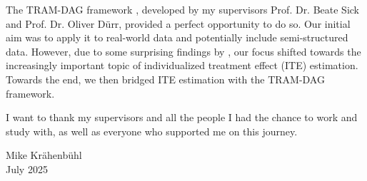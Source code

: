 \documentclass[11pt,a4paper,twoside]{book}
\begin{document}
The TRAM-DAG framework \citep{sick2025}, developed by my supervisors Prof. Dr. Beate Sick and Prof. Dr. Oliver D{\"u}rr, provided a perfect opportunity to do so. Our initial aim was to apply it to real-world data and potentially include semi-structured data. However, due to some surprising findings by \citet{chen2025}, our focus shifted towards the increasingly important topic of individualized treatment effect (ITE) estimation. Towards the end, we then bridged ITE estimation with the TRAM-DAG framework.

I want to thank my supervisors and all the people I had the chance to work and study with, as well as everyone who supported me on this journey.

% 
% 
% 


\bigskip

\begin{flushright}
  Mike Kr{\"a}henb{\"u}hl\\
  July 2025
\end{flushright}

\end{document}

